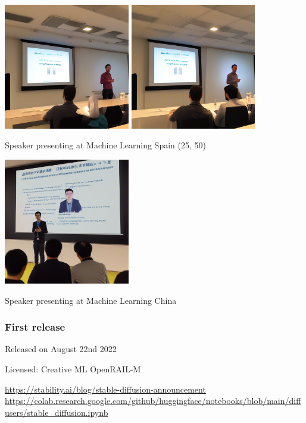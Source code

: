 \documentclass[17pt,aspectratio=169,hyperref={pdfusetitle,colorlinks,allcolors=olive}]{beamer}
\begin{document}
\begin{frame}[fragile]

  \includegraphics[width=5.5cm]{figs/sd-machine-learning-spain-25}
  \includegraphics[width=5.5cm]{figs/sd-machine-learning-spain-50}

  {\small
  Speaker presenting at Machine Learning Spain (25, 50)
}  
\end{frame}

\begin{frame}[fragile]

  \includegraphics[width=5.5cm]{figs/sd-machine-learning-china-50}

  {\small
  Speaker presenting at Machine Learning China
}  
\end{frame}


\begin{frame}[fragile]
  \frametitle{First release}

  Released on August 22nd 2022

  Licensed: Creative ML OpenRAIL-M

  \begin{flushright}
    {\scriptsize
    \url{https://stability.ai/blog/stable-diffusion-announcement} \\
    \url{https://colab.research.google.com/github/huggingface/notebooks/blob/main/diffusers/stable_diffusion.ipynb} \\
    }
  \end{flushright}
\end{frame}
\end{document}
